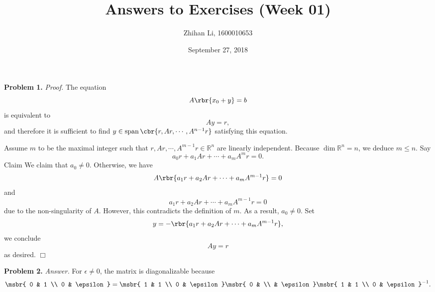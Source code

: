 \documentclass[english, nochinese]{pnote}
\title{Answers to Exercises (Week 01)}
\author{Zhihan Li, 1600010653}
\date{September 27, 2018}
\begin{document}
\maketitle

\textbf{Problem 1.} \textit{Proof.} The equation
\begin{equation}
A \rbr{ x_0 + y } = b
\end{equation}
is equivalent to
\begin{equation}
A y = r,
\end{equation}
and therefore it is sufficient to find $ y \in \mathop{\text{span}} \cbr{ r, A r, \cdots, A^{ n - 1 } r } $ satisfying this equation.

Assume $m$ to be the maximal integer such that $ r, A r, \cdots, A^{ m - 1 } r \in \mathbb{R}^n $ are linearly independent. Because $ \dim \mathbb{R}^n = n $, we deduce $ m \le n $. Say
\begin{equation}
a_0 r + a_1 A r + \cdots + a_m A^m r = 0.
\end{equation}Claim
We claim that $ a_0 \neq 0 $. Otherwise, we have
\begin{equation}
A \rbr{ a_1 r + a_2 A r + \cdots + a_m A^{ m - 1 } r } = 0
\end{equation}
and
\begin{equation}
a_1 r + a_2 A r + \cdots + a_m A^{ m - 1 } r = 0
\end{equation}
due to the non-singularity of $A$. However, this contradicts the definition of $m$. As a result, $ a_0 \neq 0 $. Set
\begin{equation}
y = - \rbr{ a_1 r + a_2 A r + \cdots + a_m A^{ m - 1 } r },
\end{equation}
we conclude
\begin{equation}
A y = r
\end{equation}
as desired.
\hfill$\Box$

\textbf{Problem 2.} \textit{Answer.} For $ \epsilon \neq 0 $, the matrix is diagonalizable because
\begin{equation}
\msbr{ 0 & 1 \\ 0 & \epsilon } = \msbr{ 1 & 1 \\ 0 & \epsilon } \msbr{ 0 & \\ & \epsilon } \msbr{ 1 & 1 \\ 0 & \epsilon }^{-1}.
\end{equation}
\end{document}
